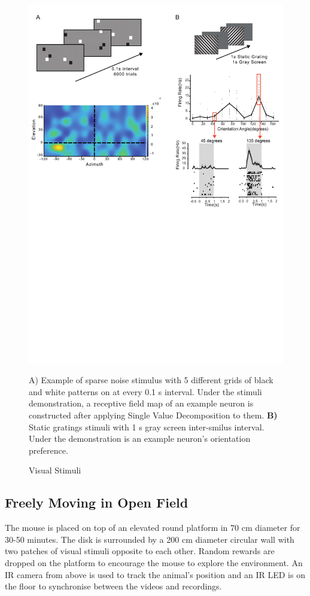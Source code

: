 \begin{figure}
    \centering
    \includegraphics[width=1\linewidth]{figures//Chapter 2//Thesis Figures/fig4_RF_and_gratings.pdf}
    \caption{Visual Stimuli}
    \label{fig:placeholder}
    {A)} Example of sparse noise stimulus with 5 different grids of black and white patterns on at every 0.1 s interval. Under the stimuli demonstration, a receptive field map of an example neuron is constructed after applying Single Value Decomposition to them. \textbf{B)} Static gratings stimuli with 1 s gray screen inter-smilus interval. Under the demonstration is an example neuron's orientation preference.
\end{figure}

\subsection{Freely Moving in Open Field}
The mouse is placed on top of an elevated round platform in 70 cm diameter for 30-50 minutes. The disk is surrounded by a 200 cm diameter circular wall with two patches of visual stimuli opposite to each other. Random rewards are dropped on the platform to encourage the mouse to explore the environment. An IR camera from above is used to track the animal's position and an IR LED is on the floor to synchronise between the videos and recordings.


